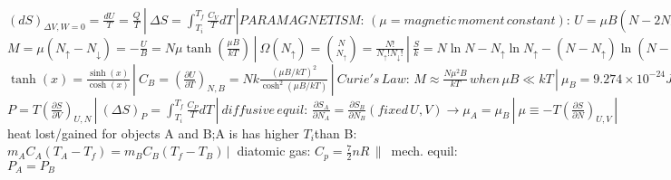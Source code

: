 \documentclass[10pt]{article}
\begin{document}
{{{	\\$(dS)_{\Delta V, W=0} = \frac{dU}{T}=\frac{Q}{T} 
	\,|\  \Delta S = \int_{T_i}^{T_f}\frac{C_V}{T}dT \,| PARAMAGNETISM:\, (\mu =magnetic\, moment\, constant): \,U =\mu B(N-2N_{\uparrow})=-N\mu B\tanh (\frac{\mu B}{kT}) \,|\  U_{dipole}\, for\, \uparrow/\downarrow= -/+ \mu B \,|\ $
	\\$M = \mu (N_{\uparrow}-N_{\downarrow})=-\frac{U}{B}=N\mu \tanh (\frac{\mu B}{kT}) \,|\  \Omega(N_{\uparrow})=\binom{N}{N_{\uparrow}}=\frac{N!}{N_{\uparrow}!N_{\downarrow}!} \,|\ \frac{S}{k} = N \ln N - N_{\uparrow}\ln N_{\uparrow} -(N-N_{\uparrow})\ln (N-N_{\uparrow}) \,|\ \sinh(x) =\frac{1}{2}(e^x-e^{-x})  \,|\ \cosh(x) =\frac{1}{2}(e^x+e^{-x}) \,|\ $
	\\$\tanh(x)=\frac{\sinh(x)}{\cosh(x)} \,|\ C_B = \left(\frac{\partial U}{\partial T}\right)_{N,B}=Nk\frac{(\mu B/kT)^2}{\cosh^2(\mu B/kT)}\,|\ Curie's \, Law: \, M \approx \frac{N\mu^2B}{kT}\, when\, \mu B \ll kT \,|\ \mu_B = 9.274 \times 10^{-24} J/T mech. \, equil:\, \frac{\partial S_A}{\partial V_A}=\frac{\partial S_B}{\partial V_B} (fixed\, U,N)\rightarrow V_A=V_B \,|\ $
	\\$P=T\left(\frac{\partial S}{\partial V}\right)_{U,N} \,|\ (\Delta S)_P = \int_{T_i}^{T_f}\frac{C_P}{T}dT \,|\ diffusive\, equil: \,\frac{\partial S_A}{\partial N_A}= \frac{\partial S_B}{\partial N_B} (fixed\, U,V) \rightarrow \mu_A=\mu_B \,|\ \mu \equiv -T\left(\frac{\partial S}{\partial N}\right)_{U,V} \,|\ $
	\\heat lost/gained for objects A and B;A is has higher $T_i$than B: $ m_AC_A(T_{A}-T_f)=m_BC_B(T_f-T_B) \,|\ $ diatomic gas: $ C_p=\frac{7}{2}nR \,\|\,$ mech. equil: $P_A=P_B$
	
	
	
}}}
\end{document}
